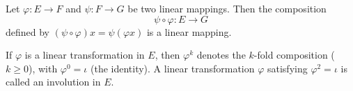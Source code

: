 Let $\varphi: E \rightarrow F$ and $\psi: F \rightarrow G$ be two linear mappings. Then the composition
$$\psi \circ \varphi: E \rightarrow G$$
defined by $(\psi \circ \varphi) x = \psi(\varphi x)$ is a linear mapping.

If $\varphi$ is a linear transformation in $E$, then $\varphi^k$ denotes the $k$-fold composition ($k \geq 0$), with $\varphi^0 = \iota$ (the identity). A linear transformation $\varphi$ satisfying $\varphi^2 = \iota$ is called an involution in $E$.
